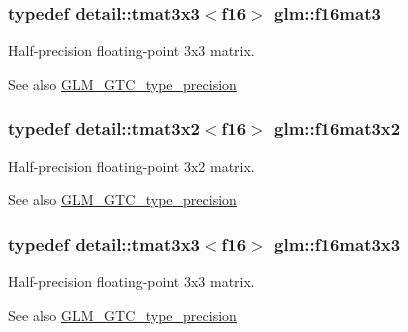 \subsubsection[{f16mat3}]{\setlength{\rightskip}{0pt plus 5cm}typedef detail\+::tmat3x3$<$f16$>$ {\bf glm\+::f16mat3}}\label{group__gtc__type__precision_ga565f29588755e09a686049d0f0c91af5}
Half-\/precision floating-\/point 3x3 matrix. \begin{DoxySeeAlso}{See also}
\hyperlink{group__gtc__type__precision}{G\+L\+M\+\_\+\+G\+T\+C\+\_\+type\+\_\+precision} 
\end{DoxySeeAlso}
\hypertarget{group__gtc__type__precision_ga52ebf7495711e769a9191a10f668a28b}{}
\subsubsection[{f16mat3x2}]{\setlength{\rightskip}{0pt plus 5cm}typedef detail\+::tmat3x2$<$f16$>$ {\bf glm\+::f16mat3x2}}\label{group__gtc__type__precision_ga52ebf7495711e769a9191a10f668a28b}
Half-\/precision floating-\/point 3x2 matrix. \begin{DoxySeeAlso}{See also}
\hyperlink{group__gtc__type__precision}{G\+L\+M\+\_\+\+G\+T\+C\+\_\+type\+\_\+precision} 
\end{DoxySeeAlso}
\hypertarget{group__gtc__type__precision_gab97d7f311dd03dcbce714197878685fa}{}
\subsubsection[{f16mat3x3}]{\setlength{\rightskip}{0pt plus 5cm}typedef detail\+::tmat3x3$<$f16$>$ {\bf glm\+::f16mat3x3}}\label{group__gtc__type__precision_gab97d7f311dd03dcbce714197878685fa}
Half-\/precision floating-\/point 3x3 matrix. \begin{DoxySeeAlso}{See also}
\hyperlink{group__gtc__type__precision}{G\+L\+M\+\_\+\+G\+T\+C\+\_\+type\+\_\+precision} 
\end{DoxySeeAlso}
\hypertarget{group__gtc__type__precision_gaebfd661385fe915a713b91654169a455}{}
